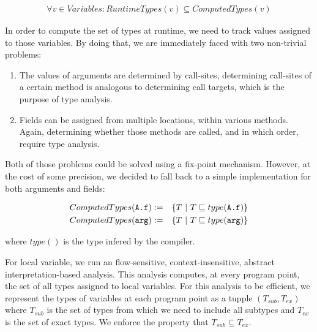 \begin{eqnarray*}
    \forall v \in Variables: RuntimeTypes(v) \subseteq ComputedTypes(v)
\end{eqnarray*}

In order to compute the set of types at runtime, we need to track values
assigned to those variables. By doing that, we are immediately faced with two
non-trivial problems:
\begin{enumerate}
    \item The values of arguments are determined by call-sites, determining
    call-sites of a certain method is analogous to determining call targets,
    which is the purpose of type analysis.

    \item Fields can be assigned from multiple locations, within various
    methods. Again, determining whether those methods are
    called, and in which order, require type analysis.
\end{enumerate}

Both of those problems could be solved using a fix-point mechanism. However, at
the cost of some precision, we decided to fall back to a simple implementation
for both arguments and fields:

\begin{eqnarray*}
    ComputedTypes(\verb/A.f/) &:=& \{ T ~|~ T \subtype type(\verb/A.f/) \} \\
    ComputedTypes(\verb/arg/) &:=& \{ T ~|~ T \subtype type(\verb/arg/) \} \\
\end{eqnarray*}

where $type()$ is the type infered by the compiler.

For local variable, we run an flow-sensitive, context-insensitive, abstract
interpretation-based analysis. This analysis computes, at every program point,
the set of all types assigned to local variables. For this analysis to be
efficient, we represent the types of variables at each program point as a
tupple $(T_{sub}, T_{ex})$ where $T_{sub}$ is the set of types from which we
need to include all subtypes and $T_{ex}$ is the set of exact types. We enforce
the property that $T_{sub} \subseteq T_{ex}$.

